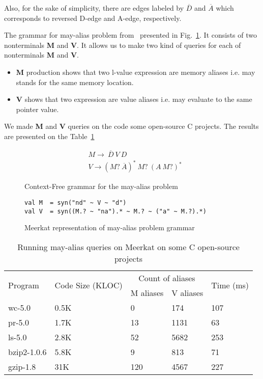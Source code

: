 Also, for the sake of simplicity, there are edges labeled by $\overline{D}$ and $\overline{A}$ which corresponds to reversed D-edge and A-edge, respectively.

The grammar for may-alias problem from~\cite{Zheng} presented in Fig.~\ref{lst:aliasGrammar}.
It consists of two nonterminals \textbf{M} and \textbf{V}.
It allows us to make two kind of queries for each of nonterminals \textbf{M} and \textbf{V}.

\begin{itemize}
    \item \textbf{M} production shows that two l-value expression are memory aliases i.e. may stands for the same memory location.
    \item \textbf{V} shows that two expression are value aliases i.e. may evaluate to the same pointer value.
\end{itemize}

We made \textbf{M} and \textbf{V} queries on the code some open-source C projects.
The results are presented on the Table~\ref{table:staticAnalysis} 

\begin{figure}[t]
\begin{align*}
& M \rightarrow\ \overline{D}\ V\ D\\
& V \rightarrow (M ?\ \overline{A})^{*} \ M?\ (A\ M?)^{*}
\end{align*}
\caption{Context-Free grammar for the may-alias problem}
\label{lst:aliasGrammar}
\end{figure}

\begin{figure}[h]
\begin{lstlisting}
val M  = syn("nd" ~ V ~ "d")
val V  = syn((M.? ~ "na").* ~ M.? ~ ("a" ~ M.?).*)
\end{lstlisting}
\caption{Meerkat representation of may-alias problem grammar}
\label{fig:aliasMeerkat}
\end{figure}


\begin{table}[t]
\centering
\begin{tabular}{|l|l|ll|l|}
\hline
\multirow{2}{*}{Program} & \multirow{2}{*}{Code Size (KLOC)} & \multicolumn{2}{c|}{Count of aliases} & \multirow{2}{*}{Time (ms)} \\ \cline{3-4}
 &  & \multicolumn{1}{c|}{M aliases} & \multicolumn{1}{c|}{V aliases} &  \\ 
\hline
\hline
wc-5.0      & 0.5K & 0   & 174  & 107 \\
pr-5.0      & 1.7K & 13  & 1131 & 63  \\
ls-5.0      & 2.8K & 52  & 5682 & 253 \\
bzip2-1.0.6 & 5.8K & 9   & 813  & 71  \\
gzip-1.8    & 31K  & 120 & 4567 & 227 \\
\hline
\end{tabular}
\caption{Running may-alias queries on Meerkat on some C open-source projects}
\label{table:staticAnalysis}
\end{table}


